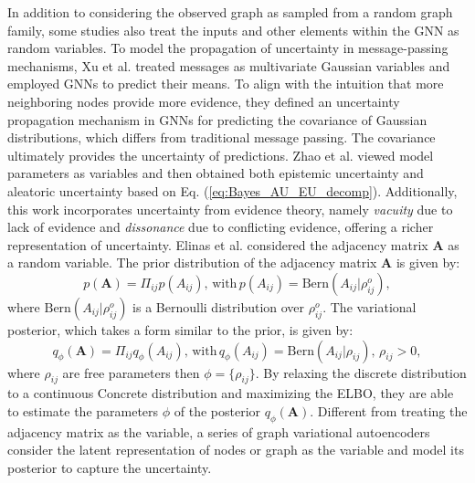In addition to considering the observed graph as sampled from a random graph family, some studies also treat the inputs and other elements within the GNN as random variables.
To model the propagation of uncertainty in message-passing mechanisms, Xu et al. \cite{xu2022uncertainty} treated messages as multivariate Gaussian variables and employed GNNs to predict their means. To align with the intuition that more neighboring nodes provide more evidence, they defined an uncertainty propagation mechanism in GNNs for predicting the covariance of Gaussian distributions, which differs from traditional message passing. The covariance ultimately provides the uncertainty of predictions. 
Zhao et al. \cite{zhao2020uncertainty} viewed model parameters as variables and then obtained both epistemic uncertainty and aleatoric uncertainty based on Eq. (\ref{eq:Bayes_AU_EU_decomp}). 
Additionally, this work incorporates uncertainty from evidence theory, namely \textit{vacuity} due to lack of evidence and \textit{dissonance} due to conflicting evidence, offering a richer representation of uncertainty. 
Elinas et al. \cite{elinas2020variational}considered the adjacency matrix $\mathbf{A}$ as a random variable. 
The prior distribution of the adjacency matrix $\mathbf{A}$ is given by:
\begin{equation}
    \label{Elinas_prior_A}
    p(\mathbf{A})=\Pi_{ij}p(A_{ij}),\,
    \text{with}\,p(A_{ij})=\text{Bern}(A_{ij}|\rho_{ij}^o), 
\end{equation}
where $\text{Bern}(A_{ij}|\rho_{ij}^o)$ is a Bernoulli distribution over $\rho_{ij}^o$. 
The variational posterior, which takes a form similar to the prior, is given by:
\begin{equation}
    \label{Elinas_var_post_A}
    q_{\phi}(\mathbf{A})=\Pi_{ij}q_{\phi}(A_{ij}),\,
    \text{with}\,q_{\phi}(A_{ij})=\text{Bern}(A_{ij}|\rho_{ij}),\, \rho_{ij}>0, 
\end{equation}
where $\rho_{ij}$ are free parameters then $\phi = \{\rho_{ij}\}$. 
By relaxing the discrete distribution to a continuous Concrete distribution \cite{jang2016categorical,maddison2016concrete} and maximizing the ELBO, they are able to estimate the parameters $\phi$ of the posterior $q_{\phi}(\mathbf{A})$. 
Different from treating the adjacency matrix as the variable, a series of graph variational autoencoders  \cite{kipf2016variational,ahn2021variational,li2020dirichlet,simonovsky2018graphvae,hasanzadeh2019semi} consider the latent representation of nodes or graph as the variable and model its posterior to capture the uncertainty. 
